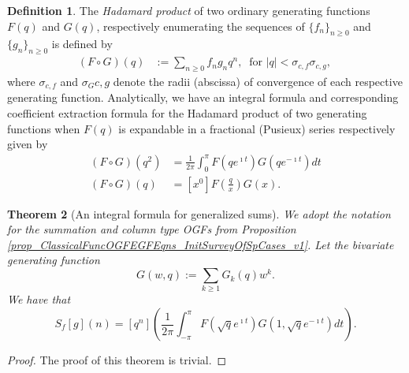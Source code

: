 \documentclass[12pt,reqno,a4letter]{article}
\numberwithin{figure}{section}
\numberwithin{table}{section}
\numberwithin{equation}{section}
\theoremstyle{plain}
\newtheorem{theorem}{Theorem}
\numberwithin{theorem}{section}
\theoremstyle{definition}
\newtheorem{definition}[theorem]{Definition}
\begin{document}
\begin{definition}
The \emph{Hadamard product} of two ordinary generating functions $F(q)$ and $G(q)$, respectively 
enumerating the sequences of $\{f_n\}_{n \geq 0}$ and $\{g_n\}_{n \geq 0}$ is defined by 
\begin{align*}
(F \circ G)(q) & := \sum_{n \geq 0} f_n g_n q^n,\ \text{ for $|q| < \sigma_{c,f} \sigma_{c,g}$, } 
\end{align*} 
where $\sigma_{c,f}$ and $\sigma_G{c,g}$ 
denote the radii (abscissa) of convergence of each respective generating function. 
Analytically, we have an integral formula and corresponding coefficient extraction formula 
for the Hadamard product of two generating functions when $F(q)$ is expandable in a 
fractional (Pusieux) series 
respectively given by \cite[\S 1.12(V); Ex.\ 1.30, p.\ 85]{ADVCOMB} \cite[\S 6.3]{ECV2} 
\begin{align*} 
(F \circ G)(q^2) & = \frac{1}{2\pi} \int_0^{\pi} F(q e^{\imath t}) G(q e^{-\imath t}) dt \\ 
(F \circ G)(q) & = [x^0] F\left(\frac{q}{x}\right) G(x). 
\end{align*}
\end{definition}

\begin{theorem}[An integral formula for generalized sums]
\label{theorem_IntFormula_HProdForSummationTypeOGFs_v2}
We adopt the notation for the summation and column type OGFs from 
Proposition \ref{prop_ClassicalFuncOGFEGFEqns_InitSurveyOfSpCases_v1}. 
Let the bivariate generating function 
\[
G(w, q) := \sum_{k \geq 1} G_k(q) w^k. 
\]
We have that 
\[
S_f[g](n) = [q^n] \left(\frac{1}{2\pi} \int_{-\pi}^{\pi} F\left(\sqrt{q} e^{\imath t}\right) 
     G(1, \sqrt{q} e^{-\imath t}) dt\right). 
\]
\end{theorem}
\begin{proof}
The proof of this theorem is trivial. 
\end{proof} 
\end{document}
